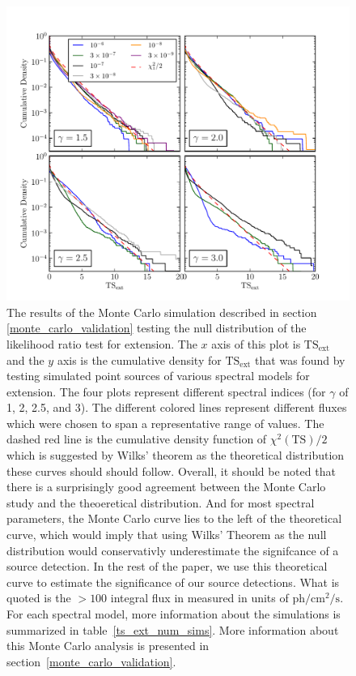 \documentclass[12pt,preprint]{aastex}
\newcommand{\mev}{\text{MeV}\xspace}
\newcommand{\ph}{\text{ph}\xspace}
\newcommand{\cm}{\text{cm}\xspace}
\renewcommand{\sec}{\text{s}\xspace}
\newcommand{\tsext}{{\ensuremath{\text{TS}_\text{ext}}}\xspace}
\newcommand{\ts}{\text{TS}\xspace}
\begin{document}
\clearpage
\begin{figure}
  \begin{center}
    \includegraphics{mc_plots/ts_ext_emin_1000.pdf}
    \end{center}
    \caption{
    The results of the Monte Carlo simulation described in section
    \ref{monte_carlo_validation} testing the null distribution of
    the likelihood ratio test for extension.  The $x$ axis of this
    plot is \tsext and the $y$ axis is the cumulative density for
    \tsext that was found by testing simulated point sources of
    various spectral models for extension. The four plots represent
    different spectral indices (for $\gamma$ of 1, 2, 2.5, and 3).
    The different colored lines represent different fluxes which were
    chosen to span a representative range of values. The dashed
    red line is the cumulative density function of $\chi^2(\ts)/2$ which is
    suggested by Wilks' theorem as the theoretical distribution these
    curves should should follow.  Overall, it should be noted that there
    is a surprisingly good agreement between the Monte Carlo study and
    the theoeretical distribution. And for most spectral parameters, the
    Monte Carlo curve lies to the left of the theoretical curve, which
    would imply that using Wilks' Theorem as the null distribution would
    conservativly underestimate the signifcance of a source detection. In
    the rest of the paper, we use this theoretical curve to estimate
    the significance of our source detections.  What is quoted is the
    $>100$ \mev integral flux in measured in units of $\ph/\cm^2/\sec$.
    For each spectral model, more information about the simulations is
    summarized in table~\ref{ts_ext_num_sims}. More
    information about this Monte Carlo analysis is presented in
    section~\ref{monte_carlo_validation}.
    }\label{ts_ext_mc}
  \end{figure}
\end{document}
